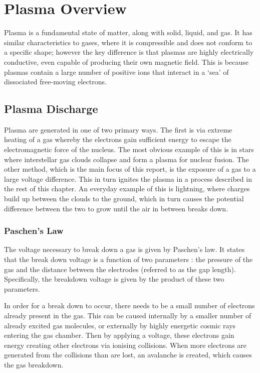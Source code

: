 \chapter{Plasma Overview}
\label{ch:plasma_overview}

Plasma is a fundamental state of matter, along with solid, liquid, and gas. It has similar characteristics to gases, where it is compressible and does not conform to a specific shape; however the key difference is that plasmas are highly electrically conductive, even capable of producing their own magnetic field. This is because plasmas contain a large number of positive ions that interact in a `sea' of dissociated free-moving electrons.

\section{Plasma Discharge}

Plasma are generated in one of two primary ways. The first is via extreme heating of a gas whereby the electrons gain sufficient energy to escape the electromagnetic force of the nucleus. The most obvious example of this is in stars where interstellar gas clouds collapse and form a plasma for nuclear fusion. The other method, which is the main focus of this report, is the exposure of a gas to a large voltage difference. This in turn ignites the plasma in a process described in the rest of this chapter. An everyday example of this is lightning, where charges build up between the clouds to the ground, which in turn causes the potential difference between the two to grow until the air in between breaks down.

\subsection{Paschen's Law}
\label{sec:paschens_law}

The voltage necessary to break down a gas is given by Paschen's law. It states that the break down voltage is a function of two parameters \cite{Lieberman2005}: the pressure of the gas and the distance between the electrodes (referred to as the gap length). Specifically, the breakdown voltage is given by the product of these two parameters.

In order for a break down to occur, there needs to be a small number of electrons already present in the gas. This can be caused internally by a smaller number of already excited gas molecules, or externally by highly energetic cosmic rays entering the gas chamber. Then by applying a voltage, these electrons gain energy creating other electrons via ionising collisions. When more electrons are generated from the collisions than are lost, an avalanche is created, which causes the gas breakdown.

